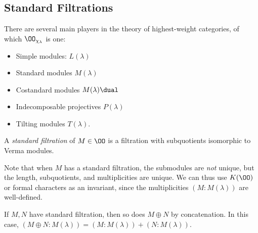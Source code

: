\hypertarget{standard-filtrations}{%
\subsection{Standard Filtrations}\label{standard-filtrations}}

There are several main players in the theory of highest-weight
categories, of which \(\OO_{\chi_\lambda}\) is one:

\begin{itemize}
\tightlist
\item
  Simple modules: \(L(\lambda)\)
\item
  Standard modules \(M(\lambda)\)
\item
  Costandard modules \(M(\lambda)\dual\)
\item
  Indecomposable projectives \(P(\lambda)\)
\item
  Tilting modules \(T(\lambda)\).
\end{itemize}

\begin{description}
\tightlist
\item[Definition (Standard Filtration/Verma flag)]
A \emph{standard filtration} of \(M\in \OO\) is a filtration with
subquotients isomorphic to Verma modules.
\end{description}

Note that when \(M\) has a standard filtration, the submodules are
\emph{not} unique, but the length, subquotients, and multiplicities are
unique. We can thus use \(K(\OO)\) or formal characters as an invariant,
since the multiplicities \((M: M(\lambda))\) are well-defined.

If \(M, N\) have standard filtration, then so does \(M \oplus N\) by
concatenation. In this case,
\((M\oplus N: M(\lambda)) = (M:M(\lambda)) + (N: M(\lambda))\).

